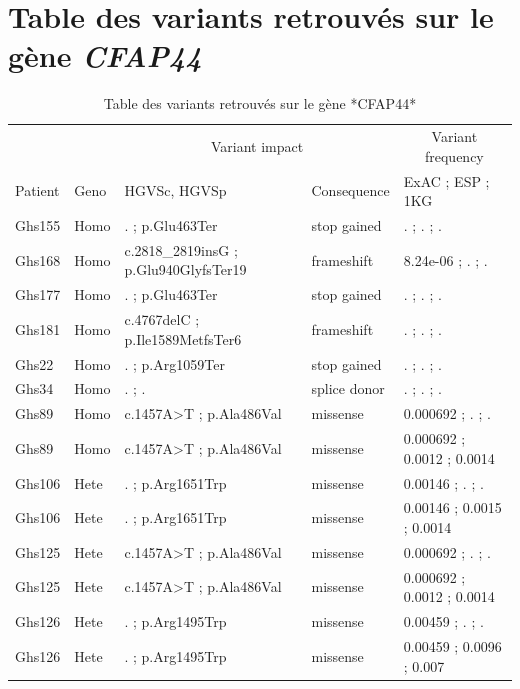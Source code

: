 \documentclass[12pt,twoside]{reedthesis}
\theoremstyle{definition}
\theoremstyle{definition}
\theoremstyle{remark}
\begin{document}
  \newpage
  
  \chapter{\texorpdfstring{Table des variants retrouvés sur le gène
  \emph{CFAP44}}{Table des variants retrouvés sur le gène CFAP44}}\label{table-des-variants-retrouves-sur-le-gene-cfap44}
  
  \begin{landscape}
  \begin{longtable}[t]{lllll}
  \caption{\label{tab:tabcfap44}Table des variants retrouvés sur le gène *CFAP44*}\\
  \toprule
  \multicolumn{2}{c}{ } & \multicolumn{2}{c}{Variant impact} & \multicolumn{1}{c}{Variant frequency} \\
  \cmidrule(l{2pt}r{2pt}){3-4} \cmidrule(l{2pt}r{2pt}){5-5}
  Patient & Geno & HGVSc, HGVSp & Consequence & ExAC ; ESP ; 1KG\\
  \midrule
  Ghs155 & Homo & . ; p.Glu463Ter & stop gained & . ; . ; .\\
  Ghs168 & Homo & c.2818\_2819insG ; p.Glu940GlyfsTer19 & frameshift & 8.24e-06 ; . ; .\\
  Ghs177 & Homo & . ; p.Glu463Ter & stop gained & . ; . ; .\\
  Ghs181 & Homo & c.4767delC ; p.Ile1589MetfsTer6 & frameshift & . ; . ; .\\
  Ghs22 & Homo & . ; p.Arg1059Ter & stop gained & . ; . ; .\\
  \addlinespace
  Ghs34 & Homo & . ; . & splice donor & . ; . ; .\\
  Ghs89 & Homo & c.1457A>T ; p.Ala486Val & missense & 0.000692 ; . ; .\\
  Ghs89 & Homo & c.1457A>T ; p.Ala486Val & missense & 0.000692 ; 0.0012 ; 0.0014\\
  Ghs106 & Hete & . ; p.Arg1651Trp & missense & 0.00146 ; . ; .\\
  Ghs106 & Hete & . ; p.Arg1651Trp & missense & 0.00146 ; 0.0015 ; 0.0014\\
  \addlinespace
  Ghs125 & Hete & c.1457A>T ; p.Ala486Val & missense & 0.000692 ; . ; .\\
  Ghs125 & Hete & c.1457A>T ; p.Ala486Val & missense & 0.000692 ; 0.0012 ; 0.0014\\
  Ghs126 & Hete & . ; p.Arg1495Trp & missense & 0.00459 ; . ; .\\
  Ghs126 & Hete & . ; p.Arg1495Trp & missense & 0.00459 ; 0.0096 ; 0.007\\

\end{longtable}
\end{landscape}
\end{document}
